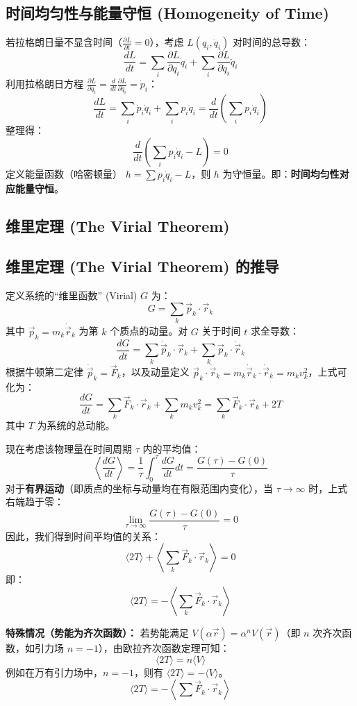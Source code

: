 \documentclass[11pt,a4paper]{article}
\begin{document}
\subsection{时间均匀性与能量守恒 (Homogeneity of Time)}
若拉格朗日量不显含时间（$\frac{\partial L}{\partial t} = 0$），考虑 $L(q_i, \dot{q}_i)$ 对时间的总导数：
\[ \frac{dL}{dt} = \sum_i \frac{\partial L}{\partial q_i} \dot{q}_i + \sum_i \frac{\partial L}{\partial \dot{q}_i} \ddot{q}_i \]
利用拉格朗日方程 $\frac{\partial L}{\partial q_i} = \frac{d}{dt} \frac{\partial L}{\partial \dot{q}_i} = \dot{p}_i$：
\[ \frac{dL}{dt} = \sum_i \dot{p}_i \dot{q}_i + \sum_i p_i \ddot{q}_i = \frac{d}{dt} \left( \sum_i p_i \dot{q}_i \right) \]
整理得：
\[ \frac{d}{dt} \left( \sum_i p_i \dot{q}_i - L \right) = 0 \]
定义能量函数（哈密顿量） $h = \sum p_i \dot{q}_i - L$，则 $h$ 为守恒量。即：\textbf{时间均匀性对应能量守恒}。

\subsection{维里定理 (The Virial Theorem)}
\subsection*{维里定理 (The Virial Theorem) 的推导}

定义系统的“维里函数” (Virial) $G$ 为：
\[ G = \sum_k \vec{p}_k \cdot \vec{r}_k \]
其中 $\vec{p}_k = m_k \dot{\vec{r}}_k$ 为第 $k$ 个质点的动量。对 $G$ 关于时间 $t$ 求全导数：
\[ \frac{dG}{dt} = \sum_k \dot{\vec{p}}_k \cdot \vec{r}_k + \sum_k \vec{p}_k \cdot \dot{\vec{r}}_k \]
根据牛顿第二定律 $\dot{\vec{p}}_k = \vec{F}_k$，以及动量定义 $\vec{p}_k \cdot \dot{\vec{r}}_k = m_k \dot{\vec{r}}_k \cdot \dot{\vec{r}}_k = m_k v_k^2$，上式可化为：
\[ \frac{dG}{dt} = \sum_k \vec{F}_k \cdot \vec{r}_k + \sum_k m_k v_k^2 = \sum_k \vec{F}_k \cdot \vec{r}_k + 2T \]
其中 $T$ 为系统的总动能。

现在考虑该物理量在时间周期 $\tau$ 内的平均值：
\[ \left\langle \frac{dG}{dt} \right\rangle = \frac{1}{\tau} \int_0^\tau \frac{dG}{dt} dt = \frac{G(\tau) - G(0)}{\tau} \]
对于\textbf{有界运动}（即质点的坐标与动量均在有限范围内变化），当 $\tau \to \infty$ 时，上式右端趋于零：
\[ \lim_{\tau \to \infty} \frac{G(\tau) - G(0)}{\tau} = 0 \]
因此，我们得到时间平均值的关系：
\[ \langle 2T \rangle + \left\langle \sum_k \vec{F}_k \cdot \vec{r}_k \right\rangle = 0 \]
即：
\[ \boxed{\langle 2T \rangle = - \left\langle \sum_k \vec{F}_k \cdot \vec{r}_k \right\rangle} \]

\textbf{特殊情况（势能为齐次函数）：}
若势能满足 $V(\alpha \vec{r}) = \alpha^n V(\vec{r})$（即 $n$ 次齐次函数，如引力场 $n=-1$），由欧拉齐次函数定理可知：
\[ \langle 2T \rangle = n \langle V \rangle \]
例如在万有引力场中，$n = -1$，则有 $\langle 2T \rangle = - \langle V \rangle$。
\[ \boxed{\langle 2T \rangle = - \left\langle \sum \vec{F}_k \cdot \vec{r}_k \right\rangle} \]
\end{document}
